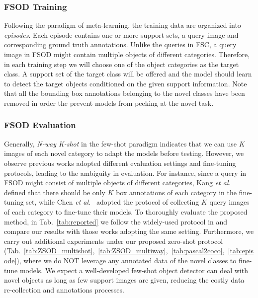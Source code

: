 \documentclass[journal]{IEEEtran}
\newcommand{\etal}{\textit{et al.}}
\begin{document}
\subsubsection{FSOD Training}
Following the paradigm of meta-learning, the training data are organized into \textit{episodes}.
Each episode contains one or more support sets, a query image and corresponding ground truth annotations.
Unlike the queries in FSC, a query image in FSOD might contain multiple objects of different categories.
Therefore, in each training step we will choose one of the object categories as the target class.
A support set of the target class will be offered and the model should learn to detect the target objects conditioned on the given support information.
Note that all the bounding box annotations belonging to the novel classes have been removed in order the prevent models from peeking at the novel task.


\subsubsection{FSOD Evaluation}
\label{section:FSOD_Evaluation}
Generally, \textit{N-way K-shot} in the few-shot paradigm indicates that we can use $K$ images of each novel category to adapt the models before testing. 
However, we observe previous works adopted different evaluation settings and fine-tuning protocols, leading to the ambiguity in evaluation.
For instance, since a query in FSOD might consist of multiple objects of different categories, Kang \etal~\cite{kang2019few} defined that there should be only $K$ box annotations of each category in the fine-tuning set, while Chen \etal~\cite{chen2018lstd} adopted the protocol of collecting $K$ query images of each category to fine-tune their models.
To thoroughly evaluate the proposed method, in Tab.~\ref{tab:reported} we follow the widely-used protocol in \cite{kang2019few} and compare our results with those works adopting the same setting.
Furthermore, we carry out additional experiments under our proposed zero-shot protocol (Tab.~\ref{tab:ZSOD_multishot},~\ref{tab:ZSOD_multiway},~\ref{tab:pascal2coco},~\ref{tab:episode}), where we do NOT leverage any annotated data of the novel classes to fine-tune models.
We expect a well-developed few-shot object detector can deal with novel objects as long as few support images are given, reducing the costly data re-collection and annotations processes. 
\end{document}
